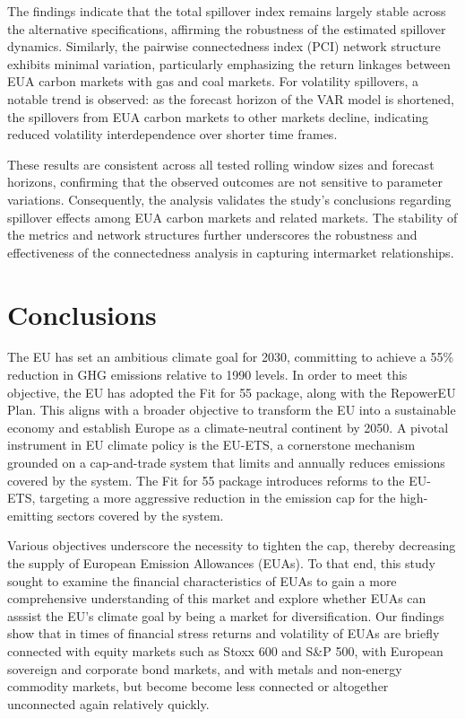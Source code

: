 \documentclass[preprint, 3p,
authoryear]{elsarticle} %
\begin{document}
The findings indicate that the total spillover index remains largely
stable across the alternative specifications, affirming the robustness
of the estimated spillover dynamics. Similarly, the pairwise
connectedness index (PCI) network structure exhibits minimal variation,
particularly emphasizing the return linkages between EUA carbon markets
with gas and coal markets. For volatility spillovers, a notable trend is
observed: as the forecast horizon of the VAR model is shortened, the
spillovers from EUA carbon markets to other markets decline, indicating
reduced volatility interdependence over shorter time frames.

These results are consistent across all tested rolling window sizes and
forecast horizons, confirming that the observed outcomes are not
sensitive to parameter variations. Consequently, the analysis validates
the study's conclusions regarding spillover effects among EUA carbon
markets and related markets. The stability of the metrics and network
structures further underscores the robustness and effectiveness of the
connectedness analysis in capturing intermarket relationships.

\hypertarget{conclusions}{%
\section{\texorpdfstring{Conclusions
\label{conclusion}}{Conclusions }}\label{conclusions}}

The EU has set an ambitious climate goal for 2030, committing to achieve
a 55\% reduction in GHG emissions relative to 1990 levels. In order to
meet this objective, the EU has adopted the Fit for 55 package, along
with the RepowerEU Plan. This aligns with a broader objective to
transform the EU into a sustainable economy and establish Europe as a
climate-neutral continent by 2050. A pivotal instrument in EU climate
policy is the EU-ETS, a cornerstone mechanism grounded on a
cap-and-trade system that limits and annually reduces emissions covered
by the system. The Fit for 55 package introduces reforms to the EU-ETS,
targeting a more aggressive reduction in the emission cap for the
high-emitting sectors covered by the system.

Various objectives underscore the necessity to tighten the cap, thereby
decreasing the supply of European Emission Allowances (EUAs). To that
end, this study sought to examine the financial characteristics of EUAs
to gain a more comprehensive understanding of this market and explore
whether EUAs can asssist the EU's climate goal by being a market for
diversification. Our findings show that in times of financial stress
returns and volatility of EUAs are briefly connected with equity markets
such as Stoxx 600 and S\&P 500, with European sovereign and corporate
bond markets, and with metals and non-energy commodity markets, but
become become less connected or altogether unconnected again relatively
quickly.
\end{document}
